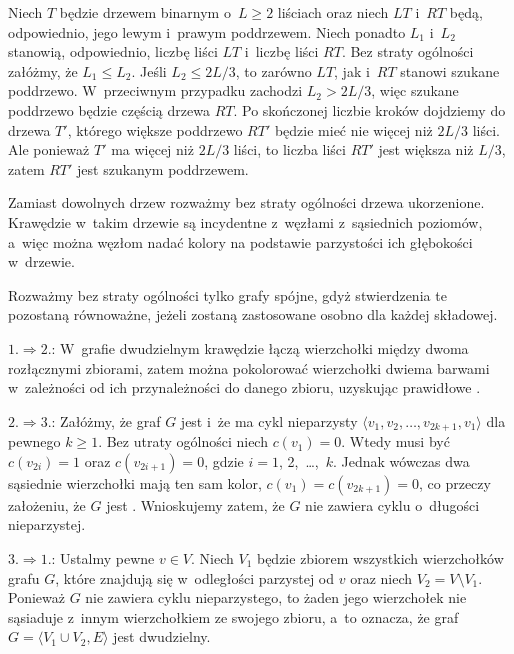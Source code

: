 \noindent Niech $T$ będzie drzewem binarnym o~$L\ge2$ liściach oraz niech $LT$ i~$RT$ będą, odpowiednio, jego lewym i~prawym poddrzewem.
Niech ponadto $L_1$ i~$L_2$ stanowią, odpowiednio, liczbę liści $LT$ i~liczbę liści $RT$.
Bez straty ogólności załóżmy, że $L_1\le L_2$.
Jeśli $L_2\le2L/3$, to zarówno $LT$, jak i~$RT$ stanowi szukane poddrzewo.
W~przeciwnym przypadku zachodzi $L_2>2L/3$, więc szukane poddrzewo będzie częścią drzewa $RT$.
Po skończonej liczbie kroków dojdziemy do drzewa $T'$, którego większe poddrzewo $RT'$ będzie mieć nie więcej niż $2L/3$ liści.
Ale ponieważ $T'$ ma więcej niż $2L/3$ liści, to liczba liści $RT'$ jest większa niż $L/3$, zatem $RT'$ jest szukanym poddrzewem.

\problems


\subproblem %
Zamiast dowolnych drzew rozważmy bez straty ogólności drzewa ukorzenione.
Krawędzie w~takim drzewie są incydentne z~węzłami z~sąsiednich poziomów, a~więc można węzłom nadać kolory na podstawie parzystości ich głębokości w~drzewie.

\subproblem %
Rozważmy bez straty ogólności tylko grafy spójne, gdyż stwierdzenia te pozostaną równoważne, jeżeli zostaną zastosowane osobno dla każdej składowej.
\medskip

$1.\Rightarrow 2.$: W~grafie dwudzielnym krawędzie łączą wierzchołki między dwoma rozłącznymi zbiorami, zatem można pokolorować wierzchołki dwiema barwami w~zależności od ich przynależności do danego zbioru, uzyskując prawidłowe .
\medskip

$2.\Rightarrow 3.$: Załóżmy, że graf $G$ jest  i~że ma cykl nieparzysty $\langle v_1,v_2,\dots,v_{2k+1},v_1\rangle$ dla pewnego $k\ge1$.
Bez utraty ogólności niech $c(v_1)=0$.
Wtedy musi być $c(v_{2i})=1$ oraz $c(v_{2i+1})=0$, gdzie $i=1$, 2,~\dots,~$k$.
Jednak wówczas dwa sąsiednie wierzchołki mają ten sam kolor, $c(v_1)=c(v_{2k+1})=0$, co przeczy założeniu, że $G$ jest .
Wnioskujemy zatem, że $G$ nie zawiera cyklu o~długości nieparzystej.
\medskip

$3.\Rightarrow 1.$: Ustalmy pewne $v\in V$.
Niech $V_1$ będzie zbiorem wszystkich wierzchołków grafu $G$, które znajdują się w~odległości parzystej od $v$ oraz niech $V_2=V\setminus V_1$.
Ponieważ $G$ nie zawiera cyklu nieparzystego, to żaden jego wierzchołek nie sąsiaduje z~innym wierzchołkiem ze swojego zbioru, a~to oznacza, że graf $G=\langle V_1\cup V_2,E\rangle$ jest dwudzielny.

